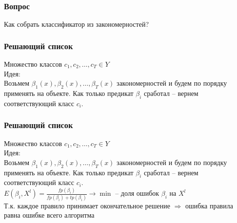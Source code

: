 \documentclass[12pt]{beamer}
\begin{document}
\begin{frame}\frametitle{Вопрос}
Как собрать классификатор из закономерностей?
\end{frame}

\begin{frame}\frametitle{Решающий список}
Множество классов $c_1,c_2,\dots, c_T \in Y$\\
\vspace{5mm}
Идея:\\
Возьмем $\beta_1(x), \beta_2(x), \dots, \beta_T(x)$ закономерностей и будем по порядку применять на объекте. 
Как только предикат $\beta_i$ сработал -- вернем соответствующий класс $c_i$.
\end{frame}

\begin{frame}\frametitle{Решающий список}
Множество классов $c_1,c_2,\dots, c_T \in Y$\\
\vspace{5mm}
Идея:\\
Возьмем $\beta_1(x), \beta_2(x), \dots, \beta_T(x)$ закономерностей и будем по порядку применять на объекте. 
Как только предикат $\beta_i$ сработал -- вернем соответствующий класс $c_i$.\\
\vspace{5mm}
$E(\beta_i, X^l) = \frac{fp(\beta_i)}{fp(\beta_i)+tp(\beta_i)} \rightarrow \min$ -- доля ошибок $\beta_i$ на $X^l$\\
\vspace{5mm}
Т.к. каждое правило принимает окончательное решение $\Rightarrow$ ошибка правила равна ошибке всего алгоритма
\end{frame}

\end{document}
